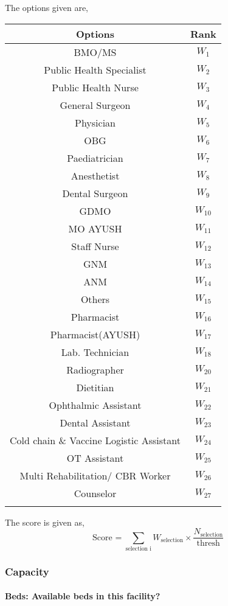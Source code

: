 \documentclass[oneside]{article}
\newcommand{\tsub}[2]{\text{#1}_{\text{#2}}}
\newcommand{\tsubb}[2]{#1_{\text{#2}}}
\newenvironment{ttable}
{
\begin{center}
\begin{tabular}{c|c}
\hline
}
{
\\ \hline
\end{tabular}
\end{center}
}
\begin{document}
The options given are,
\begin{ttable}
Options & Rank \\ \hline
BMO/MS & $W_1$ \\
Public Health Specialist & $W_2$ \\
Public Health Nurse & $W_3$ \\
General Surgeon & $W_4$ \\
Physician & $W_5$ \\
OBG & $W_6$ \\
Paediatrician & $W_7$ \\
Anesthetist & $W_8$ \\
Dental Surgeon & $W_9$ \\
	GDMO & $W_{10}$ \\
	MO AYUSH & $W_{11}$ \\
	Staff Nurse & $W_{12}$ \\
	GNM & $W_{13}$ \\
	ANM & $W_{14}$ \\
	Others & $W_{15}$ \\
	Pharmacist & $W_{16}$ \\
	Pharmacist(AYUSH) & $W_{17}$ \\
	Lab. Technician & $W_{18}$ \\
	Radiographer & $W_{20}$ \\
	Dietitian & $W_{21}$ \\
	Ophthalmic Assistant & $W_{22}$ \\
	Dental Assistant & $W_{23}$ \\
	Cold chain \& Vaccine Logistic Assistant & $W_{24}$ \\
	OT Assistant & $W_{25}$ \\
	Multi Rehabilitation/ CBR Worker & $W_{26}$ \\
	Counselor & $W_{27}$ \\
\hline
\end{ttable}
The score is given as,
\[
	\tsub{Score}{} = \sum_{\text{selection i}} \tsubb{W}{selection} \times \dfrac{\tsubb{N}{selection}}{\text{thresh}}
\]

\subsubsection{Capacity}

\paragraph{Beds: Available beds in this facility?}
\end{document}
